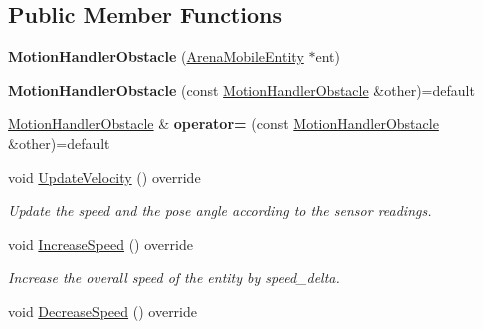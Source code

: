 \subsection*{Public Member Functions}
\begin{DoxyCompactItemize}
\item 
{\bfseries Motion\+Handler\+Obstacle} (\hyperlink{classArenaMobileEntity}{Arena\+Mobile\+Entity} $\ast$ent)\hypertarget{classMotionHandlerObstacle_a372bbd2b587c47fd3535d7044a8e8938}{}\label{classMotionHandlerObstacle_a372bbd2b587c47fd3535d7044a8e8938}

\item 
{\bfseries Motion\+Handler\+Obstacle} (const \hyperlink{classMotionHandlerObstacle}{Motion\+Handler\+Obstacle} \&other)=default\hypertarget{classMotionHandlerObstacle_a4454a8e05721c4b0aabc263961ae5f8a}{}\label{classMotionHandlerObstacle_a4454a8e05721c4b0aabc263961ae5f8a}

\item 
\hyperlink{classMotionHandlerObstacle}{Motion\+Handler\+Obstacle} \& {\bfseries operator=} (const \hyperlink{classMotionHandlerObstacle}{Motion\+Handler\+Obstacle} \&other)=default\hypertarget{classMotionHandlerObstacle_a6678c9e294e30b6f932fa49919fe27ff}{}\label{classMotionHandlerObstacle_a6678c9e294e30b6f932fa49919fe27ff}

\item 
void \hyperlink{classMotionHandlerObstacle_ad41e6be12c163937f5ccab36c4e35be8}{Update\+Velocity} () override
\begin{DoxyCompactList}\small\item\em Update the speed and the pose angle according to the sensor readings. \end{DoxyCompactList}\item 
void \hyperlink{classMotionHandlerObstacle_a92d97972af3a64916b68c82110b94a63}{Increase\+Speed} () override\hypertarget{classMotionHandlerObstacle_a92d97972af3a64916b68c82110b94a63}{}\label{classMotionHandlerObstacle_a92d97972af3a64916b68c82110b94a63}

\begin{DoxyCompactList}\small\item\em Increase the overall speed of the entity by speed\+\_\+delta. \end{DoxyCompactList}\item 
void \hyperlink{classMotionHandlerObstacle_addd08ae470619432221d7b92368b6565}{Decrease\+Speed} () override\hypertarget{classMotionHandlerObstacle_addd08ae470619432221d7b92368b6565}{}\label{classMotionHandlerObstacle_addd08ae470619432221d7b92368b6565}


\end{DoxyCompactItemize}
